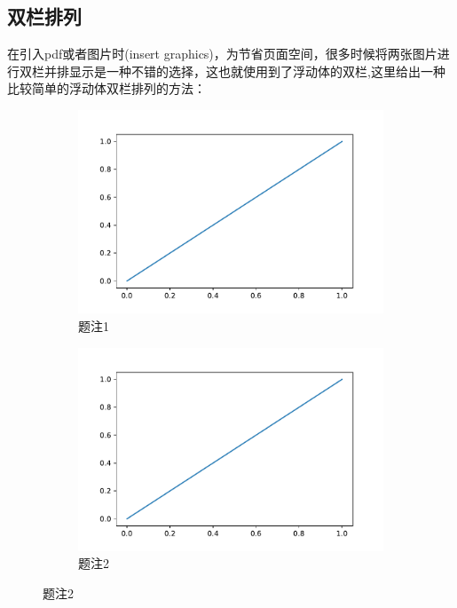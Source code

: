 \documentclass[withoutpreface,bwprint]{cumcmthesis} %
\begin{document}
\subsection{双栏排列}\label{双栏}
在引入pdf或者图片时(insert graphics)，为节省页面空间，很多时候将两张图片进行双栏并排显示是一种不错的选择，这也就使用到了浮动体的双栏,这里给出一种比较简单的浮动体双栏排列的方法：
\begin{figure}[H]
  \caption{两个图并排放置}\label{sub_cap}
  \centering
  \begin{subfigure}{0.45\textwidth}
    \includegraphics[width=\textwidth]{./asset/figure.pdf}
    \caption{题注1}
  \end{subfigure}
  \begin{subfigure}{0.45\textwidth}
    \includegraphics[width=\textwidth]{./asset/figure.pdf}
    \caption{题注2}
  \end{subfigure}
\end{figure}
\end{document}
